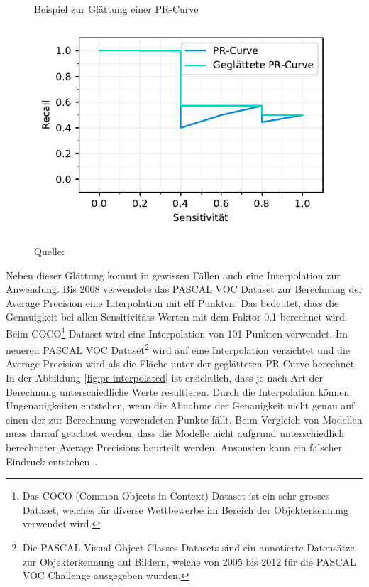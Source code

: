 \begin{figure}[h!]
    \captionsetup{width=.9\linewidth}
    \caption{Beispiel zur Glättung einer PR-Curve}
    \label{fig:pr-smoothed}
    \centering
    \includegraphics[scale=1]{graphics/matplot/ap__pr-smoothed.pdf}\\
    \caption*{Quelle: \textcite{AP}}
\end{figure}

Neben dieser Glättung kommt in gewissen Fällen auch eine Interpolation zur Anwendung. Bis 2008 verwendete das PASCAL VOC Dataset zur Berechnung der Average Precision eine Interpolation mit elf Punkten. Das bedeutet, dass die Genauigkeit bei allen Sensitivitäts-Werten mit dem Faktor 0.1 berechnet wird. Beim COCO\footnote{Das COCO (Common Objects in Context) Dataset ist ein sehr grosses Dataset, welches für diverse Wettbewerbe im Bereich der Objekterkennung verwendet wird.} Dataset wird eine Interpolation von 101 Punkten verwendet. Im neueren PASCAL VOC Dataset\footnote{Die PASCAL Visual Object Classes Datasets sind ein annotierte Datensätze zur Objekterkennung auf Bildern, welche von 2005 bis 2012 für die PASCAL VOC Challenge ausgegeben wurden.} wird auf eine Interpolation verzichtet und die Average Precision wird als die Fläche unter der geglätteten PR-Curve berechnet. In der Abbildung \ref{fig:pr-interpolated} ist ersichtlich, dass je nach Art der Berechnung unterschiedliche Werte resultieren. Durch die Interpolation können Ungenauigkeiten entstehen, wenn die Abnahme der Genauigkeit nicht genau auf einen der zur Berechnung verwendeten Punkte fällt. Beim Vergleich von Modellen muss darauf geachtet werden, dass die Modelle nicht aufgrund unterschiedlich berechneter Average Precisions beurteilt werden. Ansonsten kann ein falscher Eindruck entstehen~\autocite{AP}.

